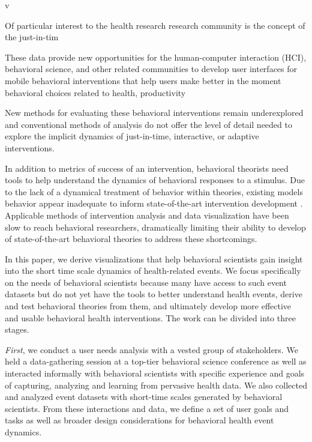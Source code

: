 v


Of particular interest to the health research research community is the concept of the just-in-tim


These data provide new opportunities for the human-computer interaction (HCI), behavioral science, and other related communities to develop user interfaces for mobile behavioral interventions that help users make better in the moment behavioral choices related to health\cite{klasnja2012,nahum2012}, productivity\cite{ho2005,sohn2005,jewell2011}

New methods for evaluating these behavioral interventions remain underexplored and conventional methods of analysis do not offer the level of detail needed to explore the implicit dynamics of just-in-time, interactive, or adaptive interventions.


In addition to metrics of success of an intervention, behavioral theorists need tools to help understand the dynamics of behavioral responses to a stimulus.
Due to the lack of a dynamical treatment of behavior within theories, existing models behavior appear inadequate to inform state-of-the-art intervention development \cite{riley2011}.
Applicable methods of intervention analysis and data visualization have been slow to reach behavioral researchers, dramatically limiting their ability to develop of state-of-the-art behavioral theories to address these shortcomings.


In this paper, we derive visualizations that help behavioral scientists gain insight into the short time scale dynamics of health-related events. We focus specifically on the needs of behavioral scientists because many have access to such event datasets but do not yet have the tools to better understand health events, derive and test behavioral theories from them, and ultimately develop more effective and usable behavioral health interventions. The work can be divided into three stages.

\textit{First}, we conduct a user needs analysis with a vested group of stakeholders. We held a data-gathering session at a top-tier behavioral science conference as well as interacted informally with behavioral scientists with specific experience and goals of capturing, analyzing and learning from pervasive health data. We also collected  and analyzed event datasets with short-time scales generated by behavioral scientists. From these interactions and data, we define a set of user goals and tasks as well as broader design considerations for behavioral health event dynamics.


